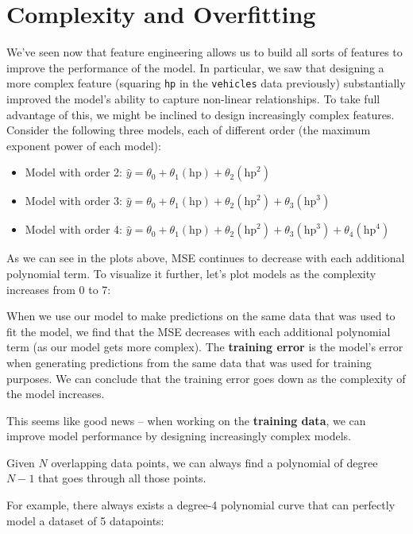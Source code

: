 \documentclass[
  letterpaper,
  DIV=11,
  numbers=noendperiod]{scrreprt}
\providecommand{\tightlist}{%
  \setlength{\itemsep}{0pt}\setlength{\parskip}{0pt}}\usepackage{longtable,booktabs,array}
\begin{document}
\section{Complexity and Overfitting}\label{complexity-and-overfitting}

We've seen now that feature engineering allows us to build all sorts of
features to improve the performance of the model. In particular, we saw
that designing a more complex feature (squaring \texttt{hp} in the
\texttt{vehicles} data previously) substantially improved the model's
ability to capture non-linear relationships. To take full advantage of
this, we might be inclined to design increasingly complex features.
Consider the following three models, each of different order (the
maximum exponent power of each model):

\begin{itemize}
\tightlist
\item
  Model with order 2:
  \(\hat{y} = \theta_0 + \theta_1 (\text{hp}) + \theta_2 (\text{hp}^2)\)
\item
  Model with order 3:
  \(\hat{y} = \theta_0 + \theta_1 (\text{hp}) + \theta_2 (\text{hp}^2) + \theta_3 (\text{hp}^3)\)
\item
  Model with order 4:
  \(\hat{y} = \theta_0 + \theta_1 (\text{hp}) + \theta_2 (\text{hp}^2) + \theta_3 (\text{hp}^3) + \theta_4 (\text{hp}^4)\)
\end{itemize}

As we can see in the plots above, MSE continues to decrease with each
additional polynomial term. To visualize it further, let's plot models
as the complexity increases from 0 to 7:

When we use our model to make predictions on the same data that was used
to fit the model, we find that the MSE decreases with each additional
polynomial term (as our model gets more complex). The \textbf{training
error} is the model's error when generating predictions from the same
data that was used for training purposes. We can conclude that the
training error goes down as the complexity of the model increases.

This seems like good news -- when working on the \textbf{training data},
we can improve model performance by designing increasingly complex
models.

\begin{tcolorbox}[enhanced jigsaw, coltitle=black, leftrule=.75mm, left=2mm, bottomrule=.15mm, bottomtitle=1mm, opacityback=0, breakable, arc=.35mm, opacitybacktitle=0.6, toptitle=1mm, title=\textcolor{quarto-callout-tip-color}{\faLightbulb}\hspace{0.5em}{Math Fact: Polynomial Degrees}, colbacktitle=quarto-callout-tip-color!10!white, titlerule=0mm, rightrule=.15mm, colframe=quarto-callout-tip-color-frame, toprule=.15mm, colback=white]

Given \(N\) overlapping data points, we can always find a polynomial of
degree \(N-1\) that goes through all those points.

For example, there always exists a degree-4 polynomial curve that can
perfectly model a dataset of 5 datapoints:

\end{tcolorbox}
\end{document}
